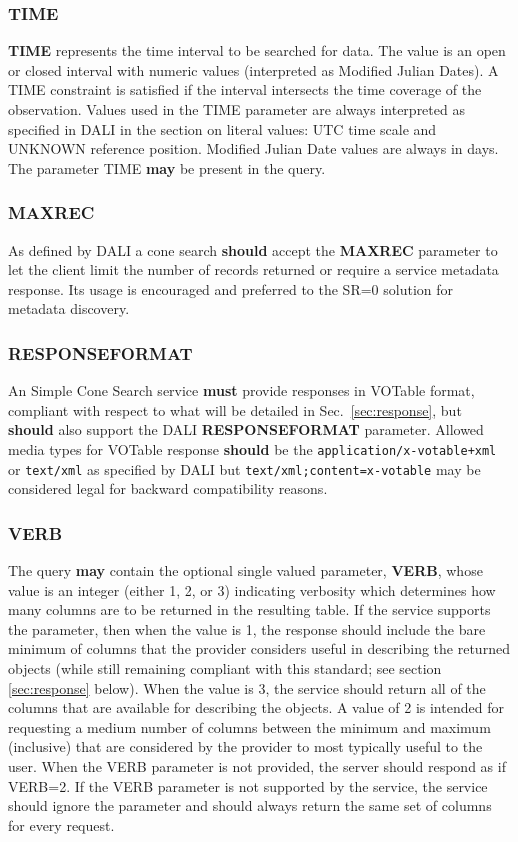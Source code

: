 \documentclass[11pt,a4paper]{ivoa}
\begin{document}
\subsubsection{TIME} \textbf{TIME} represents the time interval to be
searched for data. The value is an open or closed interval with numeric
values (interpreted as Modified Julian Dates). A TIME constraint is
satisfied if the interval intersects the time coverage of the
observation. Values used in the TIME parameter are always interpreted as
specified in DALI in the section on literal values: UTC time scale and
UNKNOWN reference position. Modified Julian Date values are always in
days. The parameter TIME \textbf{may} be present in the query. 

\subsubsection{MAXREC} As defined by DALI a cone search \textbf{should}
accept the \textbf{MAXREC} parameter to let the client limit the number
of records returned or require a service metadata response.
Its usage is encouraged and preferred to the SR=0 solution for metadata
discovery.

\subsubsection{RESPONSEFORMAT} \label{subsubsec:responseformat} An
Simple Cone Search service \textbf{must} provide responses in VOTable
\citep{std:VOTABLE} format, compliant with respect to what will be
detailed in Sec.~\ref{sec:response}, but \textbf{should} also support
the DALI \textbf{RESPONSEFORMAT} parameter. Allowed media types for
VOTable response \textbf{should} be the
\texttt{application/x-votable+xml} or \texttt{text/xml} as specified by
DALI but \texttt{text/xml;content=x-votable} may be considered legal for
backward compatibility reasons.

\subsubsection{VERB} The query \textbf{may} contain the optional single
valued parameter, \textbf{VERB}, whose value is an integer (either 1, 2,
or 3) indicating verbosity which determines how many columns are to be
returned in the resulting table. If the service supports the parameter,
then when the value is 1, the response should include the bare minimum
of columns that the provider considers useful in describing the returned
objects (while still remaining compliant with this standard; see section
\ref{sec:response} below). When the value is 3, the service should
return all of the columns that are available for describing the objects.
A value of 2 is intended for requesting a medium number of columns
between the minimum and maximum (inclusive) that are considered by the
provider to most typically useful to the user. When the VERB parameter
is not provided, the server should respond as if VERB=2. If the VERB
parameter is not supported by the service, the service should ignore the
parameter and should always return the same set of columns for every
request.
\end{document}

